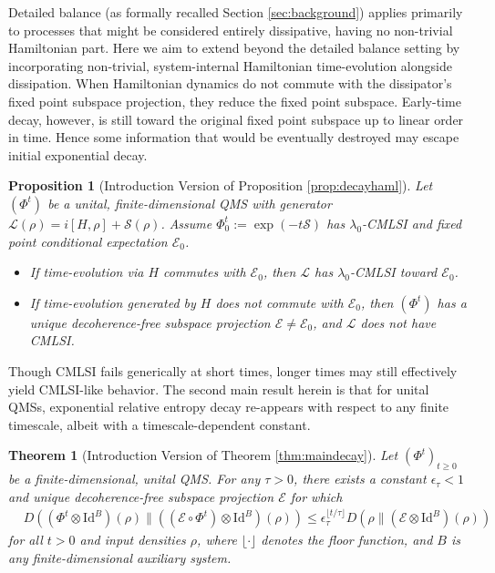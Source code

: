 \documentclass[accepted=2026-02-01, letterpaper]{quantumarticle}
\newtheorem{prop}[lemma]{Proposition}
\newtheorem{theorem}[lemma]{Theorem}
\newcommand{\E}{\mathcal{E}}
\renewcommand{\S}{\mathcal{S}}
\renewcommand{\L}{\mathcal{L}}
\newcommand{\Id}{\mathrm{Id}}
\newcommand{\Ha}{H}
\newcommand{\mightbealign}{}
\newcommand{\mightbenewline}{}
\begin{document}
Detailed balance (as formally recalled Section \ref{sec:background}) applies primarily to processes that might be considered entirely dissipative, having no non-trivial Hamiltonian part. Here we aim to extend beyond the detailed balance setting by incorporating non-trivial, system-internal Hamiltonian time-evolution alongside dissipation. When Hamiltonian dynamics do not commute with the dissipator's fixed point subspace projection, they reduce the fixed point subspace. Early-time decay, however, is still toward the original fixed point subspace up to linear order in time. Hence some information that would be eventually destroyed may escape initial exponential decay.
\begin{prop}[Introduction Version of Proposition \ref{prop:decayhaml}] \label{prop:main1intro}
Let $(\Phi^t)$ be a unital, finite-dimensional QMS with generator $\L(\rho) = i [\Ha, \rho] + \S(\rho)$.
Assume $\Phi_0^t := \exp(-t \S)$ has $\lambda_0$-CMLSI and fixed point conditional expectation $\E_0$.
\begin{itemize}
    \item If time-evolution via $\Ha$ commutes with $\E_0$, then $\L$ has $\lambda_0$-CMLSI toward $\E_0$.
    \item If time-evolution generated by $\Ha$ does not commute with $\E_0$, then $(\Phi^t)$ has a unique decoherence-free subspace projection $\E \neq \E_0$, and $\L$ does not have CMLSI.
\end{itemize}
\end{prop}
Though CMLSI fails generically at short times, longer times may still effectively yield CMLSI-like behavior. The second main result herein is that for unital QMSs, exponential relative entropy decay re-appears with respect to any finite timescale, albeit with a timescale-dependent constant. %
\begin{theorem}[Introduction Version of Theorem \ref{thm:maindecay}] \label{thm:introdecay}
Let $(\Phi^t)_{t \geq 0}$ be a finite-dimensional, unital QMS. For any $\tau > 0$, there exists a constant $\epsilon_\tau < 1$ and unique decoherence-free subspace projection $\E$ for which
\begin{equation*}
\begin{split}
& D((\Phi^t \otimes \Id^B)(\rho) \| ((\E \circ \Phi^{t}) \otimes \Id^B)(\rho)) \mightbenewline \mightbealign
 \leq \epsilon_\tau^{\lfloor t / \tau \rfloor} D(\rho \| (\E \otimes \Id^B)(\rho))
\end{split}
\end{equation*}
for all $t > 0$ and input densities $\rho$, where $\lfloor \cdot \rfloor$ denotes the floor function, and $B$ is any finite-dimensional auxiliary system.%
\end{theorem}
\end{document}
